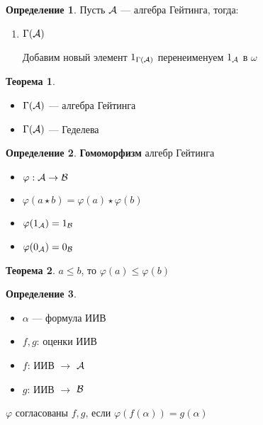 \documentclass[oneside]{book}
\theoremstyle{plain}
\theoremstyle{remark}
\theoremstyle{definition}
\newtheorem{theorem}{Теорема}[section]
\newtheorem*{definition}{Определение}
\begin{document}
\begin{definition}
Пусть \(\mathcal{A}\) --- алгебра Гейтинга, тогда:
\begin{enumerate}
\item \(\Gamma(\mathcal{A})\) \\
\begin{center}
\end{center}

Добавим новый элемент \(1_{\Gamma(\mathcal{A})}\) перенеименуем \(1_{\mathcal{A}}\) в  \(\omega\)
\end{enumerate}
\end{definition}
\begin{theorem}
\-
\begin{itemize}
\item \(\Gamma(\mathcal{A})\) --- алгебра Гейтинга
\item \(\Gamma(\mathcal{A})\) --- Геделева
\end{itemize}
\end{theorem}
\begin{definition}
\textbf{Гомоморфизм} алгебр Гейтинга \\
\begin{itemize}
\item \(\varphi: \mathcal{A} \to \mathcal{B}\)
\item \(\varphi(a \star b) = \varphi(a)\star\varphi(b)\)
\item \(\varphi(1_{\mathcal{A}}) = 1_{\mathcal{B}}\)
\item \(\varphi(0_{\mathcal{A}}) = 0_{\mathcal{B}}\)
\end{itemize}
\end{definition}
\begin{theorem}
\(a \le b\), то \(\varphi(a) \le \varphi(b)\)
\end{theorem}
\begin{definition}
\-
\begin{itemize}
\item \(\alpha\) --- формула ИИВ
\item \(f, g\): оценки ИИВ
\item \(f\): ИИВ \(\to\) \(\mathcal{A}\)
\item \(g\): ИИВ \(\to\) \(\mathcal{B}\)
\end{itemize}
\(\varphi\) согласованы \(f, g\), если \(\varphi(f(\alpha)) = g(\alpha)\)
\end{definition}
\end{document}
